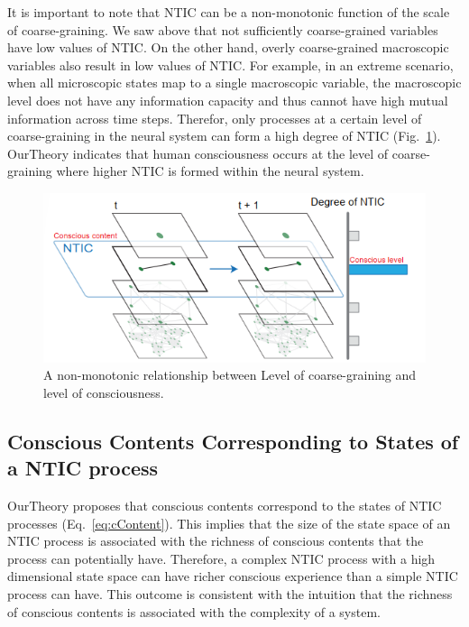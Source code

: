 \documentclass[utf8]{article}
\begin{document}
    		It is important to note that NTIC can be a non-monotonic function of the scale of coarse-graining. We saw above that not sufficiently coarse-grained variables have low values of NTIC. On the other hand, overly coarse-grained macroscopic variables  also result in low values of NTIC. For example, in an extreme scenario, when all microscopic states map to a single macroscopic variable, the macroscopic level does not have any information capacity and thus cannot have high mutual information across time steps.  Therefor, only processes at a certain level of coarse-graining in the neural system can form a high degree of NTIC (Fig.~\ref{fig:LevelOfConsciousness}). \ac{OurTheory} indicates that human consciousness occurs at the level of coarse-graining where higher NTIC is formed within the neural system. 
    		
    		\begin{figure}[H]				
        		\includegraphics[width=\textwidth]{WritingMaterials/Fig_temp/FoxitReader_2019-01-31_19-03-59.png}
        		\caption{A non-monotonic relationship between Level of coarse-graining and level of consciousness.}
        		\label{fig:LevelOfConsciousness}
    		\end{figure}
            
    			
		\subsection{Conscious Contents Corresponding to States of a NTIC process}\label{sec:cc}
    		\ac{OurTheory} proposes that conscious contents correspond to the states of NTIC processes (Eq.~\ref{eq:cContent}). This implies that the size of the state space of an NTIC process is associated with the richness of conscious contents that the process can potentially have. Therefore, a complex NTIC process with a high dimensional state space can have richer conscious experience than a simple NTIC process can have. This outcome is consistent with the intuition that the richness of conscious contents is associated with the complexity of a system. 
    		
\end{document}
